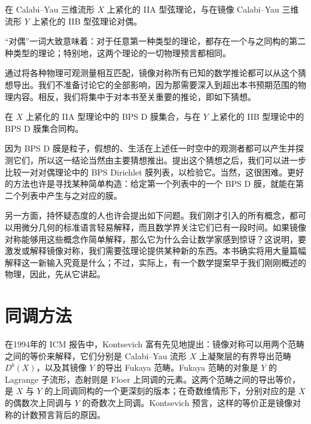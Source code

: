 \begin{conjecture}\label{conj:1.3}
在 Calabi--Yau 三维流形 $X$ 上紧化的 IIA 型弦理论，与在镜像 Calabi--Yau 三维流形 $Y$ 上紧化的 IIB 型弦理论对偶。
\end{conjecture}

“对偶”一词大致意味着：对于任意第一种类型的理论，都存在一个与之同构的第二种类型的理论；特别地，这两个理论的一切物理预言都相同。

通过将各种物理可观测量相互匹配，镜像对称所有已知的数学推论都可以从这个猜想导出。我们不准备讨论它的全部影响，因为那需要深入到超出本书预期范围的物理内容。相反，我们将集中于对本书至关重要的推论，即如下猜想。

\begin{conjecture}\label{conj:1.4}
在 $X$ 上紧化的 IIA 型理论中的 BPS D 膜集合，与在 $Y$ 上紧化的 IIB 型理论中的 BPS D 膜集合同构。
\end{conjecture}

因为 BPS D 膜是粒子，假想的、生活在上述任一时空中的观测者都可以产生并探测它们，所以这一结论当然由主要猜想推出。提出这个猜想之后，我们可以进一步比较一对对偶理论中的 BPS Dirichlet 膜列表，以检验它。当然，这很困难。更好的方法也许是寻找某种简单构造：给定第一个列表中的一个 BPS D 膜，就能在第二个列表中产生与之对应的膜。

另一方面，持怀疑态度的人也许会提出如下问题。我们刚才引入的所有概念，都可以用微分几何的标准语言轻易解释，而且数学界关注它们已有一段时间。如果镜像对称能够用这些概念作简单解释，那么它为什么会让数学家感到惊讶？这说明，要激发或解释镜像对称，我们需要弦理论提供某种新的东西。本书确实将用大量篇幅解释这一新输入究竟是什么；不过，实际上，有一个数学提案早于我们刚刚概述的物理，因此，先从它讲起。

\section{同调方法}\label{sec:1.2}

在1994年的 ICM 报告中，Kontsevich 富有先见地提出：镜像对称可以用两个范畴之间的等价来解释，它们分别是 Calabi--Yau 流形 $X$ 上凝聚层的有界导出范畴 $D^b(X)$，以及其镜像 $Y$ 的导出 Fukaya 范畴。Fukaya 范畴的对象是 $Y$ 的 Lagrange 子流形，态射则是 Floer 上同调的元素。这两个范畴之间的导出等价，是 $X$ 与 $Y$ 的上同调同构的一个更深刻的版本；在奇数维情形下，分别对应的是 $X$ 的偶数次上同调与 $Y$ 的奇数次上同调。Kontsevich 预言，这样的等价正是镜像对称的计数预言背后的原因。

